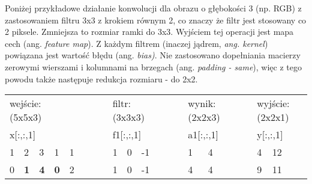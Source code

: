 Poniżej przykładowe działanie konwolucji dla obrazu o głębokości 3 (np. RGB) z zastosowaniem filtru 3x3 z krokiem równym 2, co znaczy że filtr jest stosowany co 2 piksele. Zmniejsza to rozmiar ramki do 3x3. Wyjściem tej operacji jest mapa cech (ang. \textit{feature map}). Z każdym filtrem (inaczej jądrem, \textit{ang. kernel}) powiązana jest wartość błędu (ang. \textit{bias)}. Nie zastosowano dopełniania macierzy zerowymi wierszami i kolumnami na brzegach (ang. \textit{padding - same}), więc z tego powodu także następuje redukcja rozmiaru - do 2x2. 

\begin{table}[h]
\begin{tabular}{lllllllllllllllllllllll}
\multicolumn{5}{l}{wejście: (5x5x3)}                                                                                                                   &  &  &                       & \multicolumn{3}{l}{filtr: (3x3x3)}                                          &  &  &                       & \multicolumn{4}{l}{wynik: (2x2x3)}                     &                       & \multicolumn{4}{l}{wyjście: (2x2x1)}                   \\
\multicolumn{5}{l}{x{[}:,:,1{]}}                                                                                                                       &  &  &                       & \multicolumn{3}{l}{f1{[}:,:,1{]}}                                           &  &  &                       & \multicolumn{2}{l}{a1{[}:,:,1{]}}                &  &  &                       & \multicolumn{2}{l}{y{[}:,:,1{]}}                 &  &  \\ \cline{1-5} \cline{9-11} \cline{15-16} \cline{20-21}
\multicolumn{1}{|l|}{1} & \multicolumn{1}{l|}{2}          & \multicolumn{1}{l|}{3}          & \multicolumn{1}{l|}{1}          & \multicolumn{1}{l|}{1} &  &  & \multicolumn{1}{l|}{} & \multicolumn{1}{l|}{1}  & \multicolumn{1}{l|}{0}  & \multicolumn{1}{l|}{-1} &  &  & \multicolumn{1}{l|}{} & \multicolumn{1}{l|}{1}  & \multicolumn{1}{l|}{4} &  &  & \multicolumn{1}{l|}{} & \multicolumn{1}{l|}{4} & \multicolumn{1}{l|}{12} &  &  \\ \cline{1-5} \cline{9-11} \cline{15-16} \cline{20-21}
\multicolumn{1}{|l|}{0} & \multicolumn{1}{l|}{\textbf{1}} & \multicolumn{1}{l|}{\textbf{4}} & \multicolumn{1}{l|}{\textbf{0}} & \multicolumn{1}{l|}{2} &  &  & \multicolumn{1}{l|}{} & \multicolumn{1}{l|}{1}  & \multicolumn{1}{l|}{0}  & \multicolumn{1}{l|}{-1} &  &  & \multicolumn{1}{l|}{} & \multicolumn{1}{l|}{4}  & \multicolumn{1}{l|}{4} &  &  & \multicolumn{1}{l|}{} & \multicolumn{1}{l|}{9} & \multicolumn{1}{l|}{11} &  &  \\ \cline{1-5} \cline{9-11} \cline{15-16} \cline{20-21}

\end{tabular}
\end{table}
